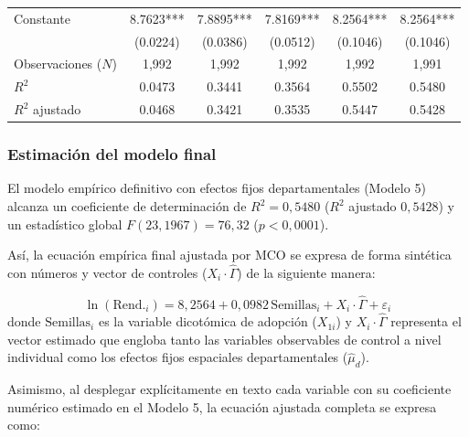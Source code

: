 \documentclass[11pt,a4paper,twocolumn]{article}
\begin{document}
\begin{table}[t]
\begin{tabular*}{\textwidth}{@{\extracolsep{\fill}}lccccc@{}}
Constante					& 8.7623*** & 7.8895*** & 7.8169*** & 8.2564*** & {8.2564***} \\
                            & (0.0224)  & (0.0386) & (0.0512) & (0.1046)  & {(0.1046)} \\
\midrule
Observaciones ($N$)         & 1,992     & 1,992    & 1,992    & 1,992    & {1,991} \\
$R^2$                       & 0.0473    & 0.3441   & 0.3564   & 0.5502   & {0.5480} \\
$R^2$ ajustado              & 0.0468    & 0.3421   & 0.3535   & 0.5447   & {0.5428} \\
\bottomrule
\end{tabular*}
\vspace{2pt}\par{}
\end{table}

\subsubsection{Estimación del modelo final}
El modelo empírico definitivo con efectos fijos departamentales (Modelo 5) alcanza un coeficiente de determinación de $R^2 = 0{,}5480$ ($R^2$ ajustado $0{,}5428$) y un estadístico global $F(23, 1967) = 76{,}32$ ($p < 0{,}0001$). 

Así, la ecuación empírica final ajustada por MCO se expresa de forma sintética con números y vector de controles ($X_i \cdot \hat{\Gamma}$) de la siguiente manera:

\begin{equation}
\ln(\text{Rend.}_i) = 8{,}2564 + 0{,}0982 \, \text{Semillas}_i + X_i \cdot \hat{\Gamma} + \varepsilon_i
\end{equation}
donde $\text{Semillas}_i$ es la variable dicotómica de adopción ($X_{1i}$) y $X_i \cdot \hat{\Gamma}$ representa el vector estimado que engloba tanto las variables observables de control a nivel individual como los efectos fijos espaciales departamentales ($\hat{\mu}_d$).

Asimismo, al desplegar explícitamente en texto cada variable con su coeficiente numérico estimado en el Modelo 5, la ecuación ajustada completa se expresa como:
\end{document}
